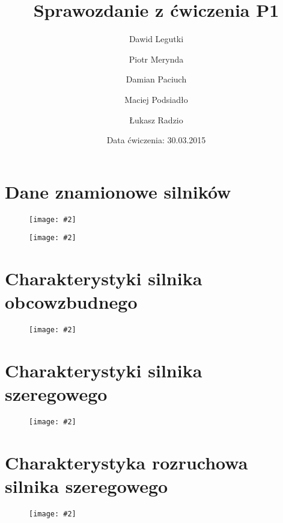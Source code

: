 \documentclass[12pt]{article}
\title{Sprawozdanie z ćwiczenia P1}
\author{ 
Dawid Legutki \and Piotr Merynda \and Damian Paciuch \and Maciej Podsiadło \and Łukasz Radzio}
\date{Data ćwiczenia: 30.03.2015}
\newcommand{\obrazek}[2]
{
	\begin{figure}[H]
	\centering
	\texttt{[image: \#2]}
	\end{figure}
}
\begin{document}
\maketitle

\section{Dane znamionowe silników}
	\obrazek{6}{tabele/DZ_obcowzbudny}
	\obrazek{6}{tabele/DZ_szeregowy}
\section{Charakterystyki silnika obcowzbudnego}

	\obrazek{12}{wykresy/Obcowzbudny}
	
	
\section{Charakterystyki silnika szeregowego}

	\obrazek{12}{wykresy/Szeregowy}
	
	
\section{Charakterystyka rozruchowa silnika szeregowego}

	\obrazek{12}{wykresy/Rozruchowa}
	
\end{document}
